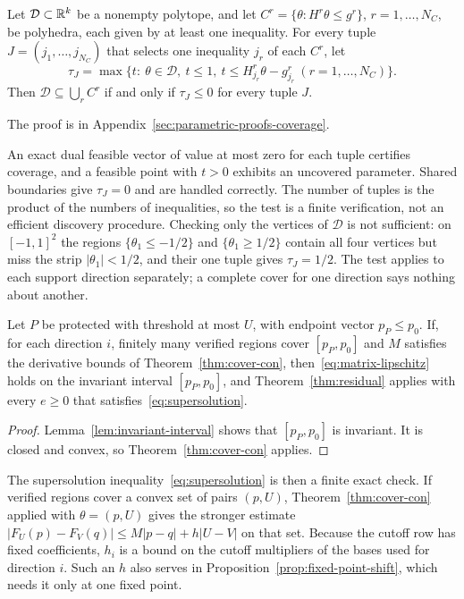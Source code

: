 \begin{proposition}\label{prop:coverage-con}
Let $\mathcal D\subset\mathbb{R}^k$ be a nonempty polytope, and let
$C^r=\{\theta:H^r\theta\le g^r\}$, $r=1,\ldots,N_C$, be polyhedra, each
given by at least one inequality. For every tuple
$J=(j_1,\ldots,j_{N_C})$ that selects one inequality $j_r$ of each $C^r$,
let
\[
 \tau_J=\max\bigl\{t:\ \theta\in\mathcal D,\ t\le1,\
  t\le H^r_{j_r}\theta-g^r_{j_r}\ (r=1,\ldots,N_C)\bigr\}.
\]
Then $\mathcal D\subseteq\bigcup_rC^r$ if and only if $\tau_J\le0$ for
every tuple $J$.
\end{proposition}

The proof is in Appendix~\ref{sec:parametric-proofs-coverage}.

An exact dual feasible vector of value at most zero for each tuple
certifies coverage, and a feasible point with $t>0$ exhibits an uncovered
parameter. Shared boundaries give $\tau_J=0$ and are handled correctly.
The number of tuples is the product of the numbers of inequalities, so the
test is a finite verification, not an efficient discovery procedure.
Checking only the vertices of $\mathcal D$ is not sufficient: on
$[-1,1]^2$ the regions $\{\theta_1\le-1/2\}$ and $\{\theta_1\ge1/2\}$
contain all four vertices but miss the strip $|\theta_1|<1/2$, and their one
tuple gives $\tau_J=1/2$. The test applies to each support direction
separately; a complete cover for one direction says nothing about another.

\begin{corollary}\label{cor:residual-input-con}
Let $P$ be protected with threshold at most $U$, with endpoint vector
$p_P\le p_0$. If, for each direction $i$, finitely many verified regions
cover $[p_P,p_0]$ and $M$ satisfies the derivative bounds of
Theorem~\ref{thm:cover-con}, then~\eqref{eq:matrix-lipschitz} holds on the
invariant interval $[p_P,p_0]$, and Theorem~\ref{thm:residual}
applies with every $e\ge0$ that satisfies~\eqref{eq:supersolution}.
\end{corollary}

\begin{proof}
Lemma~\ref{lem:invariant-interval} shows that $[p_P,p_0]$ is invariant.
It is closed and convex, so Theorem~\ref{thm:cover-con} applies.
\end{proof}

The supersolution inequality~\eqref{eq:supersolution} is then a finite
exact check. If verified regions cover a convex set of pairs $(p,U)$,
Theorem~\ref{thm:cover-con} applied with $\theta=(p,U)$ gives the stronger
estimate $|F_U(p)-F_V(q)|\le M|p-q|+h|U-V|$ on that set. Because the cutoff
row has fixed coefficients, $h_i$ is a bound on the cutoff multipliers of
the bases used for direction $i$. Such an $h$ also serves in
Proposition~\ref{prop:fixed-point-shift}, which needs it only at one fixed
point.

